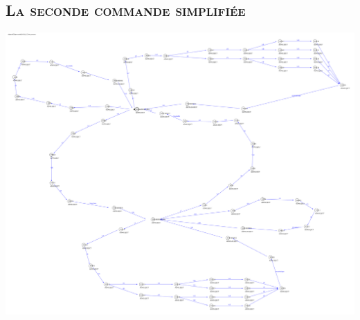 		  \subsection{\textsc{La seconde commande simplifiée}}
			
			\begin{center}
			\includegraphics[scale=0.07]{com2s.png}
			\label{fig9}
			\end{center}	
		  